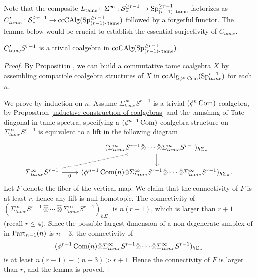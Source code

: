 Note that the composite $L_{\operatorname{tame}}\circ \Sigma^{\infty}: \operatorname{\mathcal{S}}_{*}^{\geq r-1}\to \operatorname{Sp}^{\geq r-1}_{(r-1)\text{-}\operatorname{\operatorname{tame}}}$ factorizes as $C'_{tame}: \operatorname{\mathcal{S}}_{*}^{\geq r-1}\to \operatorname{coCAlg}(\operatorname{Sp}^{\geq r-1}_{(r-1)\text{-}\operatorname{\operatorname{tame}}})$ followed by a forgetful functor. The lemma below would be crucial to establish the essential surjectivity of $C_{tame}$.

\begin{lemma}
	\label{Sigma S^n is a trivial coalgebra}
	$C'_{\operatorname{\operatorname{tame}}} S^{r-1}$ is a trivial coalgebra in $\operatorname{coCAlg}(\operatorname{Sp}^{\geq r-1}_{(r-1)\text{-}\operatorname{\operatorname{tame}}})$.
\end{lemma}
\begin{proof}
	By Proposition , we can build a commutative tame coalgebra $X$ by assembling compatible coalgebra structures of $X$ in $\operatorname{coAlg}_{\phi^n \operatorname{Com}}(\operatorname{Sp}_{tame}^{r-1})$ for each $n$.
	
	We prove by induction on $n$.
	Assume $\Sigma^{\infty}_{tame}S^{r-1}$ is a trivial $(\phi^n \operatorname{Com})$-coalgebra, by Proposition \ref{inductive construction of coalgebras} and the vanishing of Tate diagonal in tame spectra, specifying a $(\phi^{n+1} \operatorname{Com})$-coalgebra structure  on $\Sigma^{\infty}_{tame}S^{r-1}$ is equivalent to a lift in the following diagram
	\[
	\begin{tikzcd}
		& (\Sigma^{\infty}_{tame}S^{r-1} \hat{\otimes} \cdots \hat{\otimes} \Sigma^{\infty}_{tame}S^{r-1})_{h\Sigma_n}\\
		\Sigma^{\infty}_{tame}S^{r-1} & (\phi^{n-1}\Com(n)\hat{\otimes} \Sigma^{\infty}_{tame}S^{r-1} \hat{\otimes} \cdots \hat{\otimes}\Sigma^{\infty}_{tame}S^{r-1})_{h\Sigma_n}
		\arrow[from = 2-1, to = 1-2, dashed]
		\arrow[from = 2-1, to = 2-2, "0" below]
		\arrow[from = 1-2, to = 2-2].
	\end{tikzcd}
	\]
	Let $F$ denote the fiber of the vertical map. We claim that the connectivity of $F$ is at least $r$, hence any lift is null-homotopic.
	The connectivity of $(\Sigma^{\infty}_{tame}S^{r-1} \hat{\otimes} \cdots \hat{\otimes} \Sigma^{\infty}_{tame}S^{r-1})_{h\Sigma_n}$ is $n(r-1)$, which is larger than $r+1$ (recall $r\leq 4$). Since the possible largest dimension of a non-degenerate simplex of in $\operatorname{Part}_{n-1}(n)$ is $n-3$, the connectivity of 
	$$
	(\phi^{n-1}\operatorname{Com}(n)\hat{\otimes} \Sigma^{\infty}_{tame}S^{r-1} \hat{\otimes} \cdots \hat{\otimes}\Sigma^{\infty}_{tame}S^{r-1})_{h\Sigma_n}
	$$
	is at least $n(r-1)-(n-3) > r+1$. Hence the connectivity of $F$ is larger than $r$, and the lemma is proved.
\end{proof}

